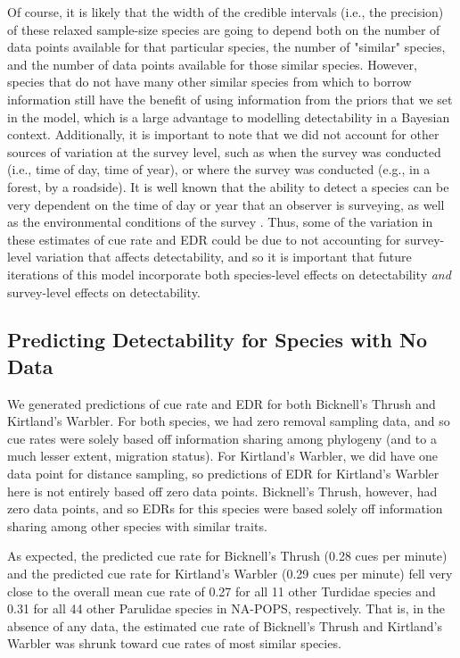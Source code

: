\documentclass[12pt]{article}
\begin{document}
\par Of course, it is likely that the width of the credible intervals (i.e., the precision) of these relaxed sample-size species are going to depend both on the number of data points available for that particular species, the number of "similar" species, and the number of data points available for those similar species.
However, species that do not have many other similar species from which to borrow information still have the benefit of using information from the priors that we set in the model, which is a large advantage to modelling detectability in a Bayesian context.
Additionally, it is important to note that we did not account for other sources of variation at the survey level, such as when the survey was conducted (i.e., time of day, time of year), or where the survey was conducted (e.g., in a forest, by a roadside).
It is well known that the ability to detect a species can be very dependent on the time of day or year that an observer is surveying, as well as the environmental conditions of the survey \citep{edwards_point_2023}.
Thus, some of the variation in these estimates of cue rate and EDR could be due to not accounting for survey-level variation that affects detectability, and so it is important that future iterations of this model incorporate both species-level effects on detectability \textit{and} survey-level effects on detectability.

\subsection{Predicting Detectability for Species with No Data}

\par We generated predictions of cue rate and EDR for both Bicknell's Thrush and Kirtland's Warbler.
For both species, we had zero removal sampling data, and so cue rates were solely based off information sharing among phylogeny (and to a much lesser extent, migration status).
For Kirtland's Warbler, we did have one data point for distance sampling, so predictions of EDR for Kirtland's Warbler here is not entirely based off zero data points.
Bicknell's Thrush, however, had zero data points, and so EDRs for this species were based solely off information sharing among other species with similar traits.

\par As expected, the predicted cue rate for Bicknell's Thrush (0.28 cues per minute) and the predicted cue rate for Kirtland's Warbler (0.29 cues per minute) fell very close to the overall mean cue rate of 0.27 for all 11 other Turdidae species and 0.31 for all 44 other Parulidae species in NA-POPS, respectively.
That is, in the absence of any data, the estimated cue rate of Bicknell's Thrush and Kirtland's Warbler was shrunk toward cue rates of most similar species.
\end{document}
